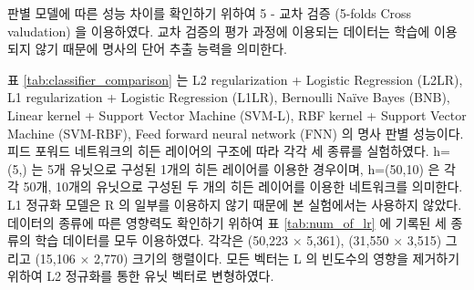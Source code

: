 \documentclass[oneside, ko,phd]{snuthesis_utf8_kor}
\begin{document}
판별 모델에 따른 성능 차이를 확인하기 위하여 5 - 교차 검증 (5-folds Cross valudation) 을 이용하였다.
교차 검증의 평가 과정에 이용되는 데이터는 학습에 이용되지 않기 때문에 명사의 단어 추출 능력을 의미한다.

표 \ref{tab:classifier_comparison} 는 L2 regularization + Logistic Regression (L2LR), L1 regularization + Logistic Regression (L1LR), Bernoulli Naïve Bayes (BNB), Linear kernel + Support Vector Machine (SVM-L), RBF kernel + Support Vector Machine (SVM-RBF), Feed forward neural network (FNN) 의 명사 판별 성능이다.
피드 포워드 네트워크의 히든 레이어의 구조에 따라 각각 세 종류를 실험하였다.
h=(5,) 는 5개 유닛으로 구성된 1개의 히든 레이어를 이용한 경우이며, h=(50,10) 은 각각 50개, 10개의 유닛으로 구성된 두 개의 히든 레이어를 이용한 네트워크를 의미한다.
L1 정규화 모델은 R 의 일부를 이용하지 않기 때문에 본 실험에서는 사용하지 않았다.
데이터의 종류에 따른 영향력도 확인하기 위하여 표 \ref{tab:num_of_lr} 에 기록된 세 종류의 학습 데이터를 모두 이용하였다.
각각은  (50,223 $\times$ 5,361), (31,550 $\times$ 3,515) 그리고 (15,106 $\times$ 2,770) 크기의 행렬이다.
모든 벡터는 L 의 빈도수의 영향을 제거하기 위하여 L2 정규화를 통한 유닛 벡터로 변형하였다.
\end{document}
